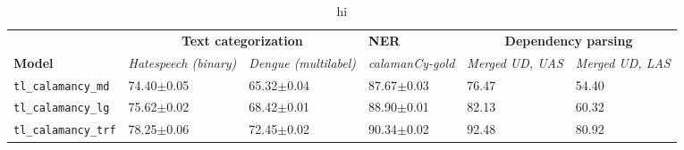 \documentclass[../emnlp2023.tex]{subfiles}
\begin{document}
\begin{table*}[t]
\begin{tabular}{@{}p{4cm}p{2cm}p{2cm}p{2cm}p{2cm}p{2cm}@{}}
\toprule
                           & \multicolumn{2}{c}{\textbf{Text categorization}} & \textbf{NER} & \multicolumn{2}{c}{\textbf{Dependency parsing}}                         \\ 
\textbf{Model}             & \textit{Hatespeech (binary)} & \textit{Dengue (multilabel)} & \textit{calamanCy-gold} & \textit{Merged UD, UAS} & \textit{Merged UD, LAS} \\ \midrule 
\texttt{tl\_calamancy\_md} & 74.40$\pm$0.05 & 65.32$\pm$0.04 & 87.67$\pm$0.03 & 76.47 & 54.40\\
\texttt{tl\_calamancy\_lg} & 75.62$\pm$0.02 & 68.42$\pm$0.01 & 88.90$\pm$0.01 & 82.13 & 60.32\\
\texttt{tl\_calamancy\_trf}& 78.25$\pm$0.06 & 72.45$\pm$0.02 & 90.34$\pm$0.02 & 92.48 & 80.92\\ \bottomrule
\end{tabular}
\caption{
    hi
}
\label{table:results}
\end{table*}
\end{document}
